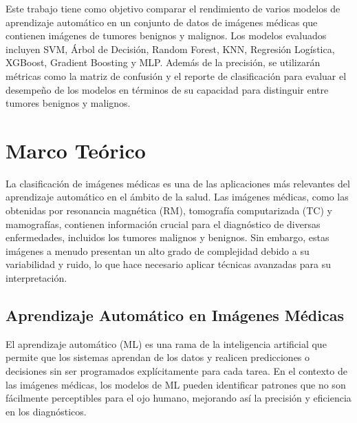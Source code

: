 \documentclass[12pt]{article}
\begin{document}
Este trabajo tiene como objetivo comparar el rendimiento de varios modelos de aprendizaje automático en un conjunto de datos de imágenes médicas que contienen imágenes de tumores benignos y malignos. Los modelos evaluados incluyen SVM, Árbol de Decisión, Random Forest, KNN, Regresión Logística, XGBoost, Gradient Boosting y MLP. Además de la precisión, se utilizarán métricas como la matriz de confusión y el reporte de clasificación para evaluar el desempeño de los modelos en términos de su capacidad para distinguir entre tumores benignos y malignos. 

\section{Marco Teórico}
La clasificación de imágenes médicas es una de las aplicaciones más relevantes del aprendizaje automático en el ámbito de la salud. Las imágenes médicas, como las obtenidas por resonancia magnética (RM), tomografía computarizada (TC) y mamografías, contienen información crucial para el diagnóstico de diversas enfermedades, incluidos los tumores malignos y benignos. Sin embargo, estas imágenes a menudo presentan un alto grado de complejidad debido a su variabilidad y ruido, lo que hace necesario aplicar técnicas avanzadas para su interpretación.

\subsection{Aprendizaje Automático en Imágenes Médicas}
El aprendizaje automático (ML) es una rama de la inteligencia artificial que permite que los sistemas aprendan de los datos y realicen predicciones o decisiones sin ser programados explícitamente para cada tarea. En el contexto de las imágenes médicas, los modelos de ML pueden identificar patrones que no son fácilmente perceptibles para el ojo humano, mejorando así la precisión y eficiencia en los diagnósticos.
\end{document}
